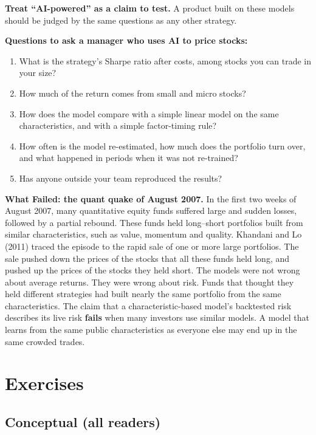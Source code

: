 \textbf{Treat ``AI-powered'' as a claim to test.} A product built on these models should be judged by the same questions as any other strategy.

\textbf{Questions to ask a manager who uses AI to price stocks:}

\begin{enumerate}
  \item What is the strategy's Sharpe ratio after costs, among stocks you can trade in your size?
  \item How much of the return comes from small and micro stocks?
  \item How does the model compare with a simple linear model on the same characteristics, and with a simple factor-timing rule?
  \item How often is the model re-estimated, how much does the portfolio turn over, and what happened in periods when it was not re-trained?
  \item Has anyone outside your team reproduced the results?
\end{enumerate}

\begin{callout}
\textbf{What Failed: the quant quake of August 2007.} In the first two weeks of August 2007, many quantitative equity funds suffered large and sudden losses, followed by a partial rebound. These funds held long--short portfolios built from similar characteristics, such as value, momentum and quality. Khandani and Lo (2011) traced the episode to the rapid sale of one or more large portfolios. The sale pushed down the prices of the stocks that all these funds held long, and pushed up the prices of the stocks they held short. The models were not wrong about average returns. They were wrong about risk. Funds that thought they held different strategies had built nearly the same portfolio from the same characteristics. The claim that a characteristic-based model's backtested risk describes its live risk \textbf{fails} when many investors use similar models. A model that learns from the same public characteristics as everyone else may end up in the same crowded trades.
\end{callout}

\section*{Exercises}

\subsection*{Conceptual (all readers)}

